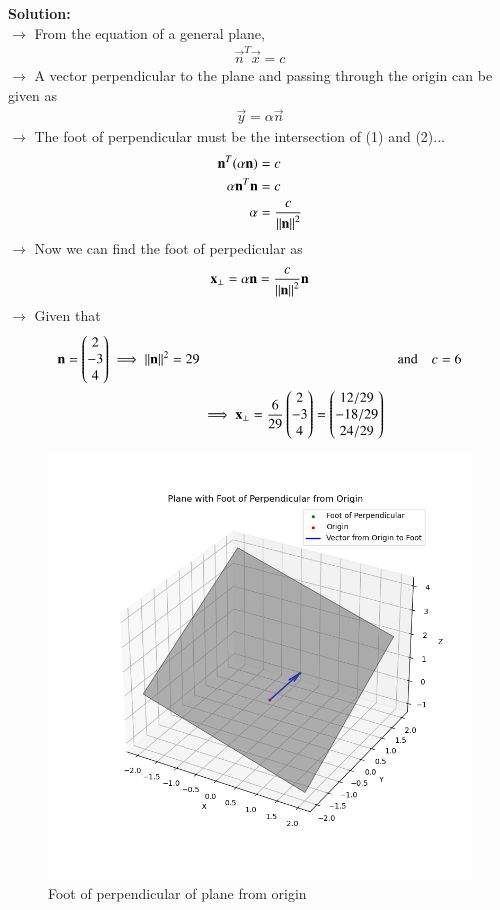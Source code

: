 \documentclass[journal]{IEEEtran}
\begin{document}
\textbf{Solution:}\\
$\rightarrow$ From the equation of a general plane,
\begin{align} \vec{n}^{T}\vec{x} = c \end{align}
$\rightarrow$ A vector perpendicular to the plane and passing through the origin can be given as \begin{align} \vec{y} = \alpha \vec{n} \end{align}
$\rightarrow$ The foot of perpendicular must be the intersection of (1) and (2)...
\begin{align}
    \mathbf{n}^{T} (\alpha \mathbf{n}) &= c \\
    \alpha \mathbf{n}^{T} \mathbf{n} &= c \\
    \alpha &= \frac{c}{\left\lVert\mathbf{n}\right\rVert^{2}}
\end{align}
$\rightarrow$ Now we can find the foot of perpedicular as
\begin{align} \mathbf{x_\perp} = \alpha \mathbf{n} = \frac{c}{\left\lVert\mathbf{n}\right\rVert^{2}} \mathbf{n} \end{align}
$\rightarrow$ Given that
\begin{align}
    \mathbf{n} = \begin{pmatrix}2\\-3\\4\end{pmatrix} \implies \left\lVert\mathbf{n}\right\rVert^{2} = 29 &&\text{and}&& c = 6 \\
    &\implies \mathbf{x_\perp} = \frac{6}{29} \begin{pmatrix}2\\-3\\4\end{pmatrix} = \begin{pmatrix}12/29\\-18/29\\24/29\end{pmatrix}
\end{align}
\begin{figure}[h!]
   \centering
   \includegraphics[width=0.6\linewidth]{figs/01.png}
   \caption{Foot of perpendicular of plane from origin}
   \label{Plot_1}
\end{figure}
\end{document}
